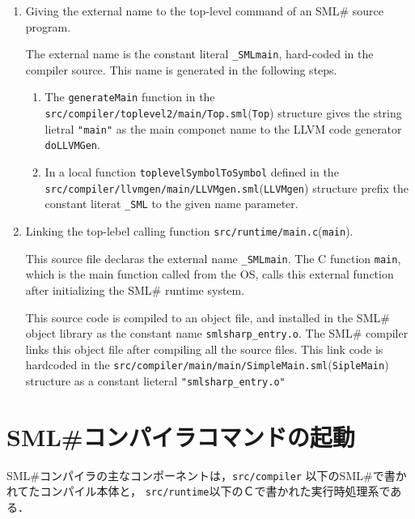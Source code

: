 \documentclass{jbook}
\newif\ifjp
\newcommand{\txt}[2]{#1}
\newcommand{\smlsharp}{SML\#}
\newcommand{\code}[1]{\mbox{\large\tt #1}}
\newcommand{\module}[2]{\code{#1}(\code{#2})}
\begin{document}
\begin{enumerate}
\item Giving the external name to the top-level command of an
\smlsharp{} source program.

	The external name is the constant literal \code{\_SMLmain},
hard-coded in the compiler source.
	This name is generated in the following steps.
\begin{enumerate}
\item The \code{generateMain} function in the 
\module{src/compiler/toplevel2/main/Top.sml}{Top}
structure gives the string lietral \code{"main"} as
the main componet name to the LLVM code generator 
\code{doLLVMGen}.
\item 
	In a local function \code{toplevelSymbolToSymbol} defined
in the \module{src/compiler/llvmgen/main/LLVMgen.sml}{LLVMgen} structure
prefix the constant literat \code{\_SML} to the given name parameter.
\end{enumerate}

\item Linking the top-lebel calling function \module{src/runtime/main.c}{main}.

	This source file declaras the external name \code{\_SMLmain}.
	The C function \code{main}, which is the main function called
from the OS, calls this external function after initializing 
the \smlsharp{} runtime system.

	This source code is compiled to an object file, 
and installed in the \smlsharp{} object library as the constant name
\code{smlsharp\_entry.o}.
	The \smlsharp{} compiler links this object file after compiling
all the source files.
	This link code is hardcoded in the
\module{src/compiler/main/main/SimpleMain.sml}{SipleMain}
structure as a constant lieteral \code{"smlsharp\_entry.o"}
\end{enumerate}
\fi%

\section{\txt{\smlsharp{}コンパイラコマンドの起動}{Invoking \smlsharp{} compiler command}}

\ifjp%
	\smlsharp{}コンパイラの主なコンポーネントは，\code{src/compiler}
以下の\smlsharp{}で書かれてたコンパイル本体と，
\code{src/runtime}以下のＣで書かれた実行時処理系である．
	
\end{document}
